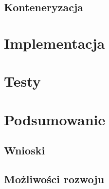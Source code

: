 \documentclass[eng,printmode,openany]{mgr}
\begin{document}
\section{Konteneryzacja}
\newpage
\chapter{Implementacja}

\newpage
\chapter{Testy}

\newpage
\chapter{Podsumowanie}
\section{Wnioski}
\section{Możliwości rozwoju}

\end{document}
